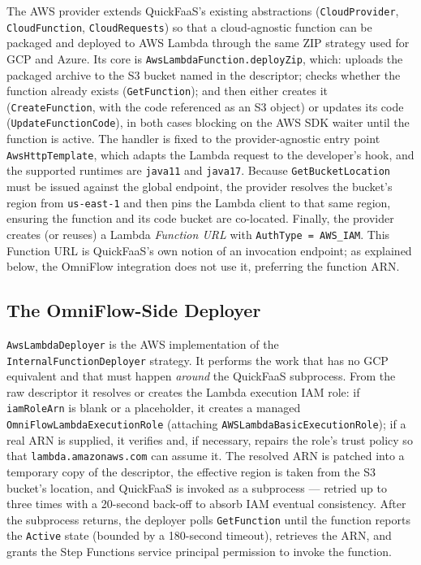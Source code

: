 The AWS provider extends QuickFaaS's existing abstractions (\texttt{CloudProvider},
\texttt{Cloud\allowbreak Function}, \texttt{CloudRequests}) so that a cloud-agnostic function can be packaged
and deployed to AWS Lambda through the same ZIP strategy used for GCP and Azure. Its core is
\texttt{AwsLambdaFunction.deployZip}, which: uploads the packaged archive to the S3 bucket named in
the descriptor; checks whether the function already exists (\texttt{GetFunction}); and then either
creates it (\texttt{CreateFunction}, with the code referenced as an S3 object) or updates its code
(\texttt{UpdateFunctionCode}), in both cases blocking on the AWS SDK waiter until the function is
active. The handler is fixed to the provider-agnostic entry point \texttt{AwsHttpTemplate}, which
adapts the Lambda request to the developer's hook, and the supported runtimes are \texttt{java11}
and \texttt{java17}. Because \texttt{GetBucketLocation} must be issued against the global endpoint,
the provider resolves the bucket's region from \texttt{us-east-1} and then pins the Lambda client
to that same region, ensuring the function and its code bucket are co-located. Finally, the
provider creates (or reuses) a Lambda \emph{Function URL} with \texttt{AuthType = AWS\_IAM}. This
Function URL is QuickFaaS's own notion of an invocation endpoint; as explained below, the OmniFlow
integration does not use it, preferring the function ARN.

\subsection{The OmniFlow-Side Deployer}
\label{subsec:omniflow-aws-deployer}

\texttt{AwsLambdaDeployer} is the AWS implementation of the \texttt{InternalFunctionDeployer}
strategy. It performs the work that has no GCP equivalent and that must happen \emph{around} the
QuickFaaS subprocess. From the raw descriptor it resolves or creates the Lambda execution IAM role:
if \texttt{iamRoleArn} is blank or a placeholder, it creates a managed
\texttt{OmniFlowLambdaExecutionRole} (attaching \texttt{AWSLambdaBasicExecutionRole}); if a real ARN
is supplied, it verifies and, if necessary, repairs the role's trust policy so that
\texttt{lambda.amazonaws.com} can assume it. The resolved ARN is patched into a temporary copy of
the descriptor, the effective region is taken from the S3 bucket's location, and QuickFaaS is
invoked as a subprocess --- retried up to three times with a 20-second back-off to absorb IAM
eventual consistency. After the subprocess returns, the deployer polls \texttt{GetFunction} until
the function reports the \texttt{Active} state (bounded by a 180-second timeout), retrieves the ARN,
and grants the Step Functions service principal permission to invoke the function.

